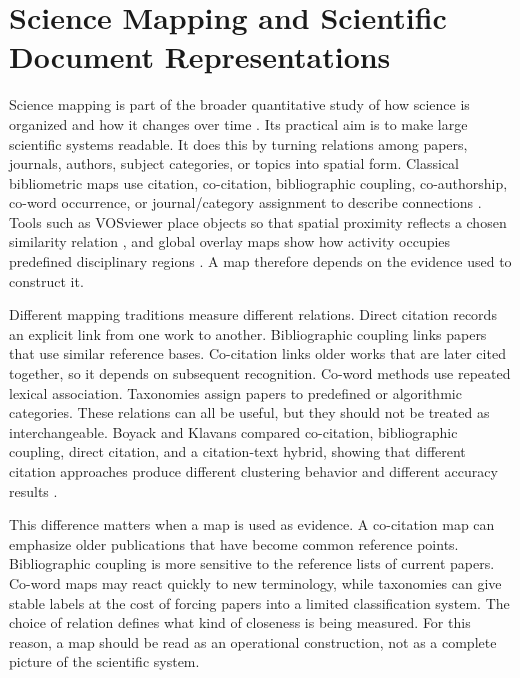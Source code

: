 
\section{Science Mapping and Scientific Document Representations}

Science mapping is part of the broader quantitative study of how science is organized and how it changes over time \parencite{fortunato2018science}. Its practical aim is to make large scientific systems readable. It does this by turning relations among papers, journals, authors, subject categories, or topics into spatial form. Classical bibliometric maps use citation, co-citation, bibliographic coupling, co-authorship, co-word occurrence, or journal/category assignment to describe connections \parencite{borner2003visualizing}. Tools such as VOSviewer place objects so that spatial proximity reflects a chosen similarity relation \parencite{vaneck2010vosviewer}, and global overlay maps show how activity occupies predefined disciplinary regions \parencite{leydesdorff2013global}. A map therefore depends on the evidence used to construct it.

Different mapping traditions measure different relations. Direct citation records an explicit link from one work to another. Bibliographic coupling links papers that use similar reference bases. Co-citation links older works that are later cited together, so it depends on subsequent recognition. Co-word methods use repeated lexical association. Taxonomies assign papers to predefined or algorithmic categories. These relations can all be useful, but they should not be treated as interchangeable. Boyack and Klavans compared co-citation, bibliographic coupling, direct citation, and a citation-text hybrid, showing that different citation approaches produce different clustering behavior and different accuracy results \parencite{boyack2010citation}.

This difference matters when a map is used as evidence. A co-citation map can emphasize older publications that have become common reference points. Bibliographic coupling is more sensitive to the reference lists of current papers. Co-word maps may react quickly to new terminology, while taxonomies can give stable labels at the cost of forcing papers into a limited classification system. The choice of relation defines what kind of closeness is being measured. For this reason, a map should be read as an operational construction, not as a complete picture of the scientific system.

